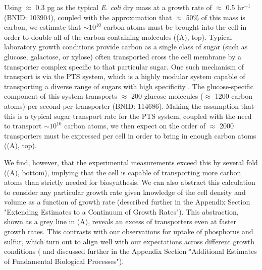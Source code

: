 Using $\approx$ 0.3 pg as the typical \textit{E. coli} dry mass at a growth rate
of $\approx$ 0.5 hr$^{-1}$ (BNID: 103904), coupled with the approximation that
$\approx$ 50\% of this mass is carbon, we estimate that $\sim 10^{10}$ carbon
atoms must be brought into the cell in order to double all of the
carbon-containing molecules ((A), top). Typical laboratory
growth conditions provide carbon as a single class of sugar (such as glucose,
galactose, or xylose) often transported cross the cell membrane by a transporter
complex specific to that particular sugar. One such mechanism of transport is
via the PTS system, which is a highly modular system capable of transporting a
diverse range of sugars with high specificity \citep{escalante2012}. The
glucose-specific component of this system transports $\approx$ 200 glucose
molecules ($\approx$ 1200 carbon atoms) per second per transporter (BNID:
114686). Making the assumption that this is a typical sugar transport rate for
the PTS system, coupled with the need to transport $\sim 10^{10}$ carbon atoms,
we then expect on the order of $\approx$ 2000 transporters must be expressed per
cell in order to bring in enough carbon atoms ((A), top).

We find, however, that the experimental measurements exceed this by several fold
((A), bottom), implying that the cell is capable of
transporting more carbon atoms than strictly needed for biosynthesis. We can
also abstract this calculation to consider any particular growth rate given
knowledge of the cell density and volume as a function of growth rate (described further in the Appendix Section "Extending Estimates to a Continuum of Growth Rates"). This abstraction, shown as a grey line in (A),
reveals an excess of transporters even at faster growth rates. This contrasts
with our observations for uptake of phosphorus and sulfur, which turn out to
align well with our expectations across different growth conditions
( and discussed further in the Appendix
Section "Additional Estimates of Fundamental Biological Processes").

